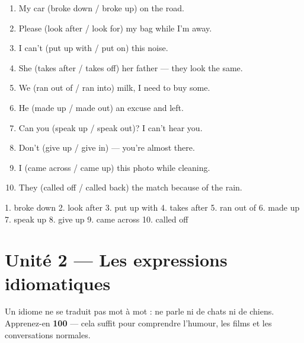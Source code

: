 \begin{exo}
\begin{enumerate}
  \item My car (broke down / broke up) on the road.
  \item Please (look after / look for) my bag while I'm away.
  \item I can't (put up with / put on) this noise.
  \item She (takes after / takes off) her father --- they look the same.
  \item We (ran out of / ran into) milk, I need to buy some.
  \item He (made up / made out) an excuse and left.
  \item Can you (speak up / speak out)? I can't hear you.
  \item Don't (give up / give in) --- you're almost there.
  \item I (came across / came up) this photo while cleaning.
  \item They (called off / called back) the match because of the rain.
\end{enumerate}
\end{exo}
\begin{corrige}[1.1]
1. broke down 2. look after 3. put up with 4. takes after 5. ran out of
6. made up 7. speak up 8. give up 9. came across 10. called off
\end{corrige}

\section{Unité 2 --- Les expressions idiomatiques}

Un idiome ne se traduit pas mot à mot :  ne parle ni de
chats ni de chiens. Apprenez-en \textbf{100} --- cela suffit pour comprendre l'humour,
les films et les conversations normales.

